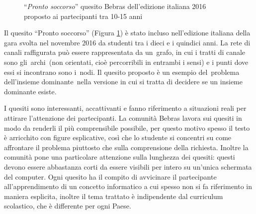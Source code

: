 \documentclass[12pt]{report}
\begin{document}
\begin{figure}[H]
	\centering
	\caption{``\textit{Pronto soccorso}'' quesito Bebras dell'edizione italiana 2016 proposto ai partecipanti tra 10-15 anni}\label{fig:prontosoccorso}
\end{figure}

Il quesito ``Pronto soccorso'' (Figura \ref{fig:prontosoccorso}) è stato incluso nell'edizione italiana della gara svolta nel novembre 2016 da studenti tra i dieci e i quindici anni.
La rete di canali raffigurata può essere rappresentata da un grafo, in cui i tratti di canale sono gli archi (non orientati, cioè percorribili in entrambi i sensi) e i punti dove essi si incontrano sono i nodi. Il quesito proposto è un esempio del problema dell'insieme dominante nella versione in cui si tratta di decidere se un insieme dominante esiste. 

I quesiti sono interessanti, accattivanti e fanno riferimento a situazioni reali per attirare l'attenzione dei partecipanti. La comunità Bebras lavora sui quesiti in modo da renderli il più comprensibile possibile, per questo motivo spesso il testo è arricchito con figure esplicative, così che lo studente si concentri su come affrontare il problema piuttosto che sulla comprensione della richiesta. Inoltre la comunità pone una particolare attenzione sulla lunghezza dei quesiti: questi devono essere abbastanza corti da essere visibili per intero su un'unica schermata del computer. Ogni quesito ha il compito di avvicinare il partecipante all'apprendimento di un concetto informatico a cui spesso non si fa riferimento in maniera esplicita, inoltre il tema trattato è indipendente dal curriculum scolastico, che è differente per ogni Paese.
\end{document}
